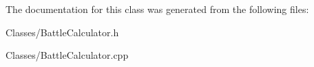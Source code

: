 The documentation for this class was generated from the following files\+:\begin{DoxyCompactItemize}
\item 
Classes/Battle\+Calculator.\+h\item 
Classes/Battle\+Calculator.\+cpp\end{DoxyCompactItemize}
